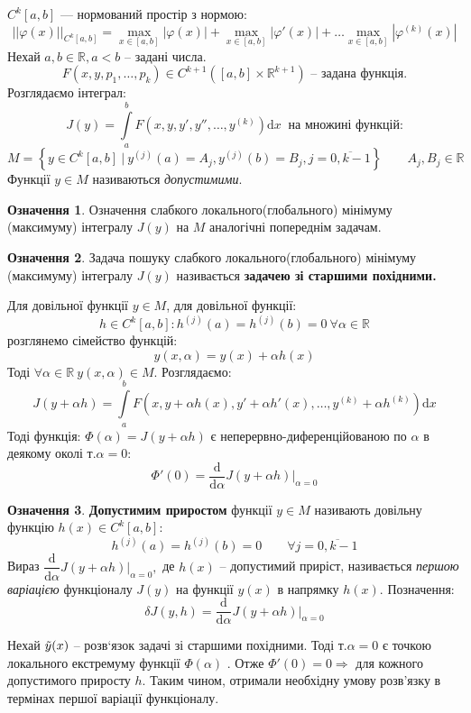 \documentclass[14pt,a4paper]{scrartcl}
\theoremstyle{definition}
\newtheorem*{defo}{Означення}
\theoremstyle{definition}
\theoremstyle{definition}
\begin{document}
$C^k[a,b]$ --- нормований простір з нормою:
$$
||\varphi(x)||_{C^k[a,b]} =
\max\limits_{x\in[a,b]}{ |\varphi(x)|} +
 \max\limits_{x\in[a,b]}{|\varphi'(x)|} + \dots
  \max\limits_{x\in[a,b]}{|\varphi^{(k)}(x)|}
$$
Нехай $a,b \in \mathbb{R}, a<b$ -- задані числа.
$$
F(x,y,p_1, \dots, p_k) \in C^{k+1}\left( [a,b] \times \mathbb{R}^{k+1} \right) \text{ -- задана функція.}
$$
Розглядаємо інтеграл:
$$
J(y) =  \int\limits_{a}^{ b}{
F(x, y, y' , y'', \dots , y^{(k)}) \mathrm{d} x
}\  \text{ на множині функцій:}
$$
$$
M = \left\lbrace
y\in C^{k}[a,b] \ \bigg| \  y^{(j)} (a) = A_j , y^{(j)} (b) = B_j , j=\overline{0, k-1}
 \right\rbrace \qquad A_j ,  B_j \in \mathbb{R}
$$
Функції $y \in M$ називаються \textit{допустимими}.
\begin{defo}
Означення слабкого локального(глобального) мінімуму (максимуму) інтегралу $J(y)$ на $M$ аналогічні попереднім задачам.
\end{defo}
\begin{defo}
 Задача пошуку слабкого  локального(глобального) мінімуму (максимуму) інтегралу $J(y)$ називається \textbf{задачею зі старшими похідними.}
\end{defo}
Для довільної функції $y\in M$, для довільної функції:
$$
h \in C^{k}[a,b] : h^{(j)}(a) = h^{(j)}(b) = 0 \ \forall \alpha \in \mathbb{R}
$$
розглянемо сімейство функцій:
$$
y(x, \alpha) = y(x) + \alpha h(x)
$$
Тоді $\forall \alpha \in \mathbb{R} \  y(x, \alpha) \in M$. Розглядаємо:
$$
J(y + \alpha h) =  \int\limits_{a }^{b}{F(x, y + \alpha h(x), y' + \alpha h' (x), \dots , y^{(k)} + \alpha h^{(k)}) \mathrm{d} x}
$$
Тоді функція: $\Phi (\alpha) = J(y + \alpha h)$ є неперервно-диференційованою по $\alpha$ в деякому околі т.$\alpha = 0$:
$$
\Phi'(0) = \frac{\mathrm{d}}{\mathrm{d} \alpha} J(y + \alpha h)\bigg|_{\alpha = 0}
$$
\begin{defo}
 \textbf{Допустимим приростом} функції $y\in M$ називають довільну функцію $h(x) \in C^k[a,b]:$
 $$
 h^{(j)} (a) = h^{(j)} (b) = 0 \qquad \forall j = \overline{0, k-1}
 $$
 Вираз $ \dfrac{\mathrm{d}}{\mathrm{d} \alpha} J(y + \alpha h) \bigg|_{\alpha = 0},$ де $h(x)$ -- допустимий приріст, називається \textit{першою варіацією} функціоналу $J(y)$ на функції $y(x)$ в напрямку $h(x)$.
 Позначення:
 $$
 \delta J(y, h) = \frac{\mathrm{d}}{\mathrm{d} \alpha} J (y + \alpha h) \bigg|_{\alpha = 0}
 $$

\end{defo}
Нехай $\tilde{y}(x)$ -- розв`язок задачі зі старшими похідними. Тоді т.$\alpha = 0 $ є точкою локального екстремуму функції $\Phi (\alpha)$ . Отже $\Phi' (0) = 0 \Longrightarrow$  для кожного допустимого приросту $h$. Таким чином, отримали необхідну умову розв'язку в термінах першої варіації функціоналу.
\end{document}
